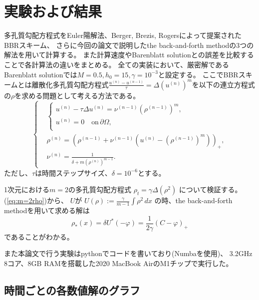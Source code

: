 \chapter{実験および結果}
\label{ch:実験及び結果}
多孔質勾配方程式をEuler陽解法、Berger, Brezis, Rogers\cite{M2AN_1979__13_4_297_0}によって提案されたBBRスキーム、
さらに今回の論文で説明したthe back-and-forth methodの3つの解法を用いて計算する。
また計算速度やBarenblatt solutionとの誤差を比較することで各計算法の違いをまとめる。
全ての実装において、厳密解であるBarenblatt solutionでは$M = 0.5, h_0 = 15, \gamma = 10^{-3}$と設定する。
ここでBBRスキームとは離散化多孔質勾配方程式$\frac{u^{(n)} - u^{(n-1)}}{\tau} = \Delta(u^{(n)})^m$を以下の連立方程式の$\rho$を求める問題として考える方法である。
\begin{equation}
    \left\{
    \begin{aligned}
        &\left\{
        \begin{aligned}
            u^{(n)} - \tau \Delta u^{(n)} = \nu^{(n-1)} \left(\rho^{(n-1)}\right)^m,\\
            u^{(n)} = 0 \quad \text{on} \, \partial \Omega,\\
        \end{aligned}
        \right.\\
        &\rho^{(n)} = \left(\rho^{(n-1)} + \nu^{(n-1)}\left(u^{(n)} - \left(\rho^{(n-1)}\right)^m\right) \right)_+,\\
        &\nu^{(n)} = \frac{1}{\delta + m\left(\rho^{(n)}\right)^{m-1}}.
    \end{aligned}
    \right.
\end{equation}
ただし、$\tau$は時間ステップサイズ、$\delta = 10^{-6}$とする。


1次元における$m=2$の多孔質勾配方程式
$
    \rho_t = \gamma\Delta (\rho^2)
$
について検証する。
(\ref{eq:m=2rho})から、
$U$が
$
    U(\rho) := \frac{\gamma}{{m-1}} \int \rho^2 \, dx
$
の時、the back-and-forth methodを用いて求める解は
\[
    \rho_*(x) = \delta U^*(- \varphi) =  \frac{1}{2\gamma}(C - \varphi)_+ 
\]
であることがわかる。

また本論文で行う実験はpythonでコードを書いており(Numbaを使用)、
3.2GHz 8コア、8GB RAMを搭載した2020 MacBook AirのM1チップで実行した。

\section{時間ごとの各数値解のグラフ}

